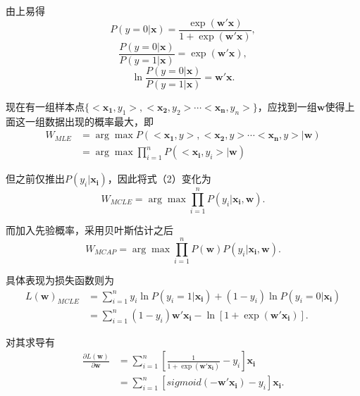 \documentclass[withoutpreface,bwprint]{cumcmthesis}
\begin{document}
由上易得
\begin{equation*}
P(y=0|\boldsymbol{x})=\frac{\exp(\boldsymbol{w}'\boldsymbol{x})}{1+\exp(\boldsymbol{w}'\boldsymbol{x})},
\end{equation*}
\begin{equation*}
\frac{P(y=0|\boldsymbol{x})}{P(y=1|\boldsymbol{x})}=\exp(\boldsymbol{w}'\boldsymbol{x}),
\end{equation*}
\begin{equation*}
\ln\frac{P(y=0|\boldsymbol{x})}{P(y=1|\boldsymbol{x})}=\boldsymbol{w}'\boldsymbol{x}.
\end{equation*}

现在有一组样本点$\{<\boldsymbol{x_{1}},y_{1}>,<\boldsymbol{x_{2}},y_{2}> \cdots<\boldsymbol{x_{n}},y_{n}>\}$，应找到一组$\boldsymbol{w}$使得上面这一组数据出现的概率最大，即
\begin{equation}
\begin{aligned}
W_{MLE}&=\arg\max P(<\boldsymbol{x_{1}},y>,<\boldsymbol{x_{2}},y> \cdots<\boldsymbol{x_{n}},y>|\boldsymbol{w})\\
&=\arg\max\prod_{i=1}^{n}P(<\boldsymbol{x_{i}},y_{i}>|\boldsymbol{w})
\end{aligned}
\end{equation}

但之前仅推出$P(y_{i}|\boldsymbol{x_{i}})$，因此将式（2）变化为
\begin{equation*}
W_{MCLE}=\arg\max\prod_{i=1}^{n}P(y_{i}|\boldsymbol{x_{i}},\boldsymbol{w}).
\end{equation*}

而加入先验概率，采用贝叶斯估计之后
\begin{equation*}
W_{MCAP}=\arg\max\prod_{i=1}^{n}P(\boldsymbol{w})P(y_{i}|\boldsymbol{x_{i}},\boldsymbol{w}).
\end{equation*}

具体表现为损失函数则为
\begin{equation*}
\begin{aligned}
L(\boldsymbol{w})_{MCLE}
&=\sum_{i=1}^{n}y_{i}\ln P(y_{i}=1|\boldsymbol{x_{i}})+(1-y_{i})\ln P(y_{i}=0|\boldsymbol{x_{i}})\\
&=\sum_{i=1}^{n}(1-y_{i})\boldsymbol{w'x_{i}}-\ln[1+\exp(\boldsymbol{w'x_{i}})].
\end{aligned}
\end{equation*}

对其求导有
\begin{equation}
\begin{aligned}
\frac{\partial{L(\boldsymbol{w})}}{\partial{\boldsymbol{w}}}&=\sum_{i=1}^{n}[\frac{1}{1+\exp(\boldsymbol{w'x_{i}})}-y_{i}]\boldsymbol{x_{i}}\\
&=\sum_{i=1}^{n}[sigmoid(-\boldsymbol{w'x_{i}})-y_{i}]\boldsymbol{x_{i}}.
\end{aligned}
\end{equation}
\end{document}
